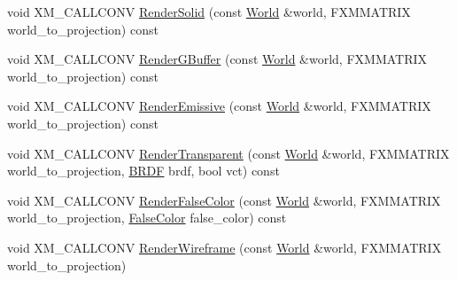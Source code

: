 \begin{DoxyCompactItemize}
\item 
void X\+M\+\_\+\+C\+A\+L\+L\+C\+O\+NV \hyperlink{classmage_1_1rendering_1_1_forward_pass_a7e473c7597d2b725cea68fa74fe20b56}{Render\+Solid} (const \hyperlink{classmage_1_1rendering_1_1_world}{World} \&world, F\+X\+M\+M\+A\+T\+R\+IX world\+\_\+to\+\_\+projection) const
\item 
void X\+M\+\_\+\+C\+A\+L\+L\+C\+O\+NV \hyperlink{classmage_1_1rendering_1_1_forward_pass_aaf7698f452eab9c6cb7cbc07b8991d5b}{Render\+G\+Buffer} (const \hyperlink{classmage_1_1rendering_1_1_world}{World} \&world, F\+X\+M\+M\+A\+T\+R\+IX world\+\_\+to\+\_\+projection) const
\item 
void X\+M\+\_\+\+C\+A\+L\+L\+C\+O\+NV \hyperlink{classmage_1_1rendering_1_1_forward_pass_ac272e648126ed4dc8386edddfc18cc76}{Render\+Emissive} (const \hyperlink{classmage_1_1rendering_1_1_world}{World} \&world, F\+X\+M\+M\+A\+T\+R\+IX world\+\_\+to\+\_\+projection) const
\item 
void X\+M\+\_\+\+C\+A\+L\+L\+C\+O\+NV \hyperlink{classmage_1_1rendering_1_1_forward_pass_a6fae34f08f23dc1a5d15921b239935fb}{Render\+Transparent} (const \hyperlink{classmage_1_1rendering_1_1_world}{World} \&world, F\+X\+M\+M\+A\+T\+R\+IX world\+\_\+to\+\_\+projection, \hyperlink{namespacemage_1_1rendering_ab8fe8684ca4bd74ba3a394b00cf125b5}{B\+R\+DF} brdf, bool vct) const
\item 
void X\+M\+\_\+\+C\+A\+L\+L\+C\+O\+NV \hyperlink{classmage_1_1rendering_1_1_forward_pass_ae18018111470a84e9313f11c72cc3326}{Render\+False\+Color} (const \hyperlink{classmage_1_1rendering_1_1_world}{World} \&world, F\+X\+M\+M\+A\+T\+R\+IX world\+\_\+to\+\_\+projection, \hyperlink{namespacemage_1_1rendering_a6c3d1f4e7a5ae72dc07226e971205534}{False\+Color} false\+\_\+color) const
\item 
void X\+M\+\_\+\+C\+A\+L\+L\+C\+O\+NV \hyperlink{classmage_1_1rendering_1_1_forward_pass_a1d6bbef579e996ffc34d25b29dd3ffef}{Render\+Wireframe} (const \hyperlink{classmage_1_1rendering_1_1_world}{World} \&world, F\+X\+M\+M\+A\+T\+R\+IX world\+\_\+to\+\_\+projection)
\end{DoxyCompactItemize}
